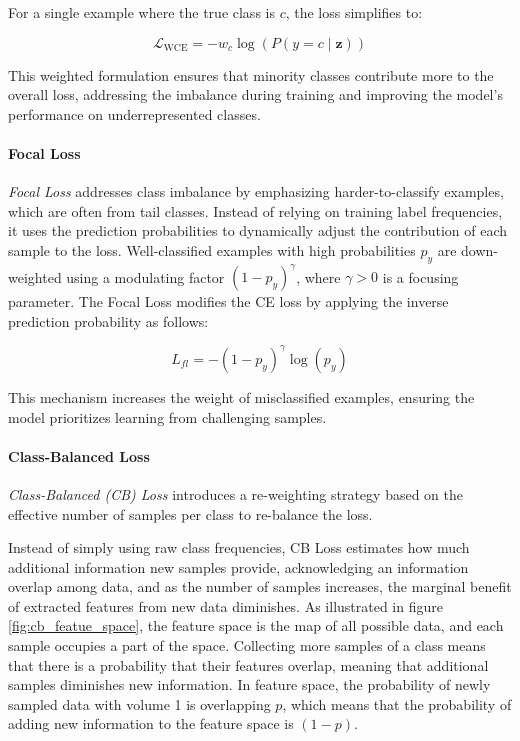 For a single example where the true class is \( c \), the loss simplifies to:

\begin{equation}
    \label{eq:ce_loss}
    \mathcal{L}_{\text{WCE}} = -w_c \log(P(y = c \mid \mathbf{z}))
\end{equation}

This weighted formulation ensures that minority classes contribute more to the overall loss, addressing the imbalance during training and improving the model's performance on underrepresented classes.


\paragraph{Focal Loss}
\emph{Focal Loss} \cite{lin2018focallossdenseobject} addresses class imbalance by emphasizing harder-to-classify examples, which are often from tail classes. Instead of relying on training label frequencies, it uses the prediction probabilities to dynamically adjust the contribution of each sample to the loss. Well-classified examples with high probabilities $p_y$ are down-weighted using a modulating factor $(1 - p_y)^\gamma$, where $\gamma > 0$ is a focusing parameter. The Focal Loss modifies the CE loss by applying the inverse prediction probability as follows:

\begin{equation}
    L_{fl} = -(1 - p_y)^\gamma \log(p_y)
\end{equation}

This mechanism increases the weight of misclassified examples, ensuring the model prioritizes learning from challenging samples. 

\paragraph{Class-Balanced Loss}
\emph{Class-Balanced (CB) Loss} \cite{cui2019classbalancedlossbasedeffective} introduces a re-weighting strategy based on the effective number of samples per class to re-balance the loss.

Instead of simply using raw class frequencies, CB Loss estimates how much additional information new samples provide, acknowledging an information overlap among data, and as the number of samples increases, the marginal benefit of extracted features from new data diminishes. As illustrated in figure \ref{fig:cb_featue_space}, the feature space is the map of all possible data, and each sample occupies a part of the space. Collecting more samples of a class means that there is a probability that their features overlap, meaning that additional samples diminishes new information.
In feature space, the probability of newly sampled data with volume 1 is overlapping $p$, which means that the probability of adding new information to the feature space is $(1-p)$. 


